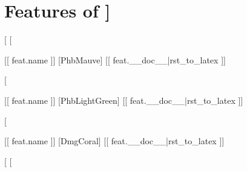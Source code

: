 \documentclass[letterpaper,10pt,twoside,twocolumn,openany]{dndbook}
\begin{document}
\chapter{Features of \newline [[ character.name ]]}

[%
[%
	\begin{paperbox}{ [[ feat.name ]] }[PhbMauve]
		[[ feat.__doc__|rst_to_latex ]]	
	\end{paperbox}
[%
	\begin{paperbox}{ [[ feat.name ]] }[PhbLightGreen]
		[[ feat.__doc__|rst_to_latex ]]	
	\end{paperbox}
[%
	\begin{paperbox}{ [[ feat.name ]] }[DmgCoral]
		[[ feat.__doc__|rst_to_latex ]]	
	\end{paperbox}
[%
[%


\end{document}
